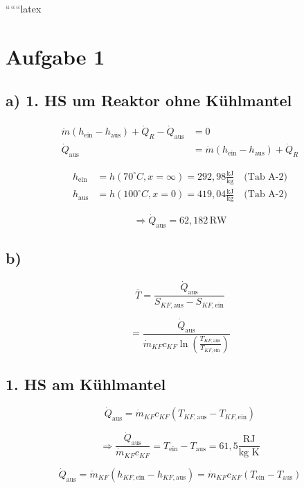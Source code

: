 
``````latex

\section*{Aufgabe 1}

\subsection*{a) 1. HS um Reaktor ohne Kühlmantel}

\begin{align*}
\dot{m} (h_{\text{ein}} - h_{\text{aus}}) + \dot{Q}_R - \dot{Q}_{\text{aus}} &= 0 \\
\dot{Q}_{\text{aus}} &= \dot{m} (h_{\text{ein}} - h_{\text{aus}}) + \dot{Q}_R
\end{align*}

\begin{align*}
h_{\text{ein}} &= h(70^\circ C, x = \infty) = 292{,}98 \frac{\text{kJ}}{\text{kg}} \quad \text{(Tab A-2)} \\
h_{\text{aus}} &= h(100^\circ C, x = 0) = 419{,}04 \frac{\text{kJ}}{\text{kg}} \quad \text{(Tab A-2)}
\end{align*}

\[
\Rightarrow \dot{Q}_{\text{aus}} = 62{,}182 \, \text{RW}
\]

\subsection*{b)}

\[
\overline{T} = \frac{\dot{Q}_{\text{aus}}}{S_{KF,\text{aus}} - S_{KF,\text{ein}}}
\]

\[
= \frac{\dot{Q}_{\text{aus}}}{\dot{m}_{KF} c_{KF} \ln \left( \frac{T_{KF,\text{aus}}}{T_{KF,\text{ein}}} \right)}
\]

\subsection*{1. HS am Kühlmantel}

\[
\dot{Q}_{\text{aus}} = \dot{m}_{KF} c_{KF} (T_{KF,\text{aus}} - T_{KF,\text{ein}})
\]

\[
\Rightarrow \frac{\dot{Q}_{\text{aus}}}{\dot{m}_{KF} c_{KF}} = T_{\text{ein}} - T_{\text{aus}} = 61{,}5 \frac{\text{RJ}}{\text{kg K}}
\]

\[
\dot{Q}_{\text{aus}} = \dot{m}_{KF} (h_{KF,\text{ein}} - h_{KF,\text{aus}}) = \dot{m}_{KF} c_{KF} (T_{\text{ein}} - T_{\text{aus}})
\]

